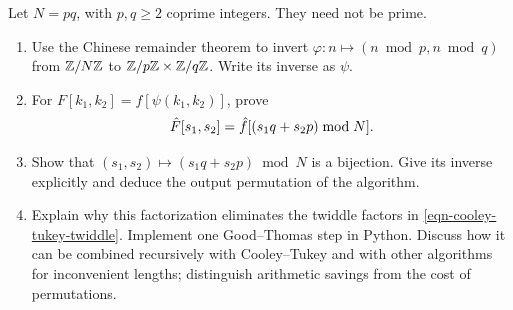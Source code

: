 
\begin{exo}
\label{exo-algo-good-thomas}
Let $N=pq$, with $p,q\geq2$ coprime integers. They need not be prime.
\begin{enumerate}
\item Use the Chinese remainder theorem to invert
$\varphi:n\mapsto(n\bmod p,n\bmod q)$ from $\mathbb{Z}/N\mathbb{Z}$ to
$\mathbb{Z}/p\mathbb{Z}\times\mathbb{Z}/q\mathbb{Z}$. Write its inverse as $\psi$.
\item For $F[k_1,k_2]=f[\psi(k_1,k_2)]$, prove
\[
 \hat{F}[s_1,s_2]=\hat{f}[(s_1q+s_2p)\bmod N].
\]
\item Show that $(s_1,s_2)\mapsto(s_1q+s_2p)\bmod N$ is a bijection.
Give its inverse explicitly and deduce the output permutation of the algorithm.
\item Explain why this factorization eliminates the twiddle factors in
\eqref{eqn-cooley-tukey-twiddle}. Implement one Good--Thomas step in Python.
Discuss how it can be combined recursively with Cooley--Tukey and with
other algorithms for inconvenient lengths; distinguish arithmetic savings
from the cost of permutations.
\end{enumerate}
\end{exo}


